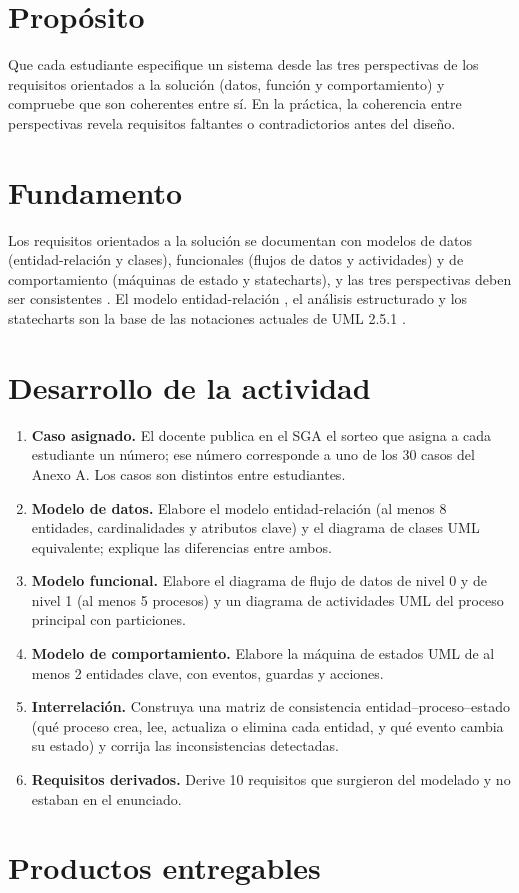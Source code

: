 \documentclass[11pt]{article}
\newcommand{\seccion}[1]{\section{\textcolor{utegreendk}{#1}}}
\begin{document}
\seccion{Propósito}

Que cada estudiante especifique un sistema desde las tres perspectivas de los requisitos orientados a la solución (datos, función y comportamiento) y compruebe que son coherentes entre sí. En la práctica, la coherencia entre perspectivas revela requisitos faltantes o contradictorios antes del diseño.

\seccion{Fundamento}

Los requisitos orientados a la solución se documentan con modelos de datos (entidad-relación y clases), funcionales (flujos de datos y actividades) y de comportamiento (máquinas de estado y statecharts), y las tres perspectivas deben ser consistentes \citep{pohl_2025}. El modelo entidad-relación \citep{chen_1976}, el análisis estructurado \citep{demarco_1979} y los statecharts \citep{harel_1987} son la base de las notaciones actuales de UML 2.5.1 \citep{omg_uml_2017}.

\seccion{Desarrollo de la actividad}

\begin{enumerate}[leftmargin=20pt,itemsep=4pt]
	\item \textbf{Caso asignado.} El docente publica en el SGA el sorteo que asigna a cada estudiante un número; ese número corresponde a uno de los 30 casos del Anexo A. Los casos son distintos entre estudiantes.
	\item \textbf{Modelo de datos.} Elabore el modelo entidad-relación (al menos 8 entidades, cardinalidades y atributos clave) y el diagrama de clases UML equivalente; explique las diferencias entre ambos.
	\item \textbf{Modelo funcional.} Elabore el diagrama de flujo de datos de nivel 0 y de nivel 1 (al menos 5 procesos) y un diagrama de actividades UML del proceso principal con particiones.
	\item \textbf{Modelo de comportamiento.} Elabore la máquina de estados UML de al menos 2 entidades clave, con eventos, guardas y acciones.
	\item \textbf{Interrelación.} Construya una matriz de consistencia entidad–proceso–estado (qué proceso crea, lee, actualiza o elimina cada entidad, y qué evento cambia su estado) y corrija las inconsistencias detectadas.
	\item \textbf{Requisitos derivados.} Derive 10 requisitos que surgieron del modelado y no estaban en el enunciado.
\end{enumerate}

\seccion{Productos entregables}
\end{document}
